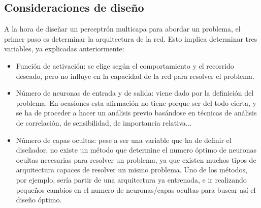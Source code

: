 \subsection{Consideraciones de diseño}
A la hora de diseñar un perceptrón multicapa para abordar un problema, el primer paso es determinar la arquitectura de la red. Esto implica determinar tres variables, ya explicadas anteriormente:
\begin{itemize}
\item Función de activación: se elige según el comportamiento y el recorrido deseado, pero no influye en la capacidad de la red para resolver el problema.
\item Número de neuronas de entrada y de salida: viene dado por la definición del problema. En ocasiones esta afirmación no tiene porque ser del todo cierta, y se ha de proceder a hacer un análisis previo basándose en técnicas de análisis de correlación, de sensibilidad, de importancia relativa...
\item Número de capas ocultas: pese a ser una variable que ha de definir el diseñador, no existe un método que determine el numero óptimo de neuronas ocultas necesarias para resolver un problema, ya que existen muchos tipos de arquitectura capaces de resolver un mismo problema. Uno de los métodos, por ejemplo, sería partir de una arquitectura ya entrenada, e ir realizando pequeños cambios en el numero de neuronas/capas ocultas para buscar así el diseño óptimo.
\end{itemize}
